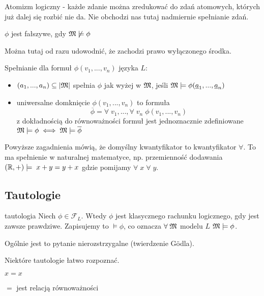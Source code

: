 Atomizm logiczny - każde zdanie można zredukować do zdań atomowych, których już dalej się rozbić nie da. Nie obchodzi nas tutaj nadmiernie spełnianie zdań.

\begin{konwencja}{}{}
  $\phi$ jest fałszywe, gdy $\mathfrak{M}\not\models\phi$
\end{konwencja}

Można tutaj od razu udowodnić, że zachodzi prawo wyłączonego środka.

Spełnianie dla formuł $\phi(v_1,...,v_n)$ języka $L$:
\begin{itemize}
  \item $(a_1,...,a_n)\subseteq |\mathfrak{M}| $ spełnia $\phi$ jak wyżej w $\mathfrak{M}$, jeśli $\mathfrak{M}\models\phi(\underline{a}_1,...,\underline{a}_n)$
  \item uniwersalne domknięcie $\phi(v_1,...,v_n)$ to formuła
    $$\overline{\phi}=\forall\;v_1,...,\forall\;v_n\;\phi(v_1,...,v_n)$$
    z dokładnością do równoważności formuł jest jednoznacznie zdefiniowane $\mathfrak{M}\models\phi\iff\mathfrak{M}\models\overline\phi$
\end{itemize}

Powyższe zagadnienia mówią, że domyślny kwantyfikator to kwantyfikator $\forall$. To ma spełnienie w naturalnej matematyce, np. przemienność dodawania $(\mathbb{R}, +)\models\;x+y=y+x$ gdzie pomijamy $\forall\;x\;\forall\;y$.

\subsection{Tautologie}

\begin{definition}{tautologia}{}
  Niech $\phi\in\mathcal{F}_L$. Wtedy $\phi$ jest  klasycznego rachunku logicznego, gdy jest zawsze prawdziwe. Zapisujemy to $\models\phi$, co oznacza $\forall\;\mathfrak{M}$ modelu $L$ $\mathfrak{M}\models\phi$.
\end{definition}

 Ogólnie jest to pytanie nierozstrzygalne (twierdzenie G\"odla).

Niektóre tautologie łatwo rozpoznać.
\begin{example}[m]
  \item $x=x$
  \item $=$ jest relacją równoważności
\end{example}

